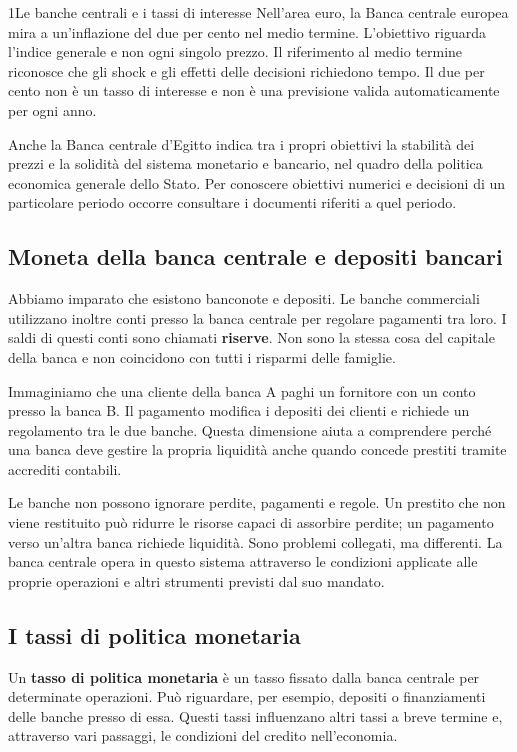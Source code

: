 \begin{lettura}{1}{Le banche centrali e i tassi di interesse}
Nell'area euro, la Banca centrale europea mira a un'inflazione del due per cento nel medio termine. L'obiettivo riguarda l'indice generale e non ogni singolo prezzo. Il riferimento al medio termine riconosce che gli shock e gli effetti delle decisioni richiedono tempo. Il due per cento non è un tasso di interesse e non è una previsione valida automaticamente per ogni anno.

Anche la Banca centrale d'Egitto indica tra i propri obiettivi la stabilità dei prezzi e la solidità del sistema monetario e bancario, nel quadro della politica economica generale dello Stato. Per conoscere obiettivi numerici e decisioni di un particolare periodo occorre consultare i documenti riferiti a quel periodo.

\subsection*{Moneta della banca centrale e depositi bancari}
Abbiamo imparato che esistono banconote e depositi. Le banche commerciali utilizzano inoltre conti presso la banca centrale per regolare pagamenti tra loro. I saldi di questi conti sono chiamati \textbf{riserve}. Non sono la stessa cosa del capitale della banca e non coincidono con tutti i risparmi delle famiglie.

Immaginiamo che una cliente della banca A paghi un fornitore con un conto presso la banca B. Il pagamento modifica i depositi dei clienti e richiede un regolamento tra le due banche. Questa dimensione aiuta a comprendere perché una banca deve gestire la propria liquidità anche quando concede prestiti tramite accrediti contabili.

Le banche non possono ignorare perdite, pagamenti e regole. Un prestito che non viene restituito può ridurre le risorse capaci di assorbire perdite; un pagamento verso un'altra banca richiede liquidità. Sono problemi collegati, ma differenti. La banca centrale opera in questo sistema attraverso le condizioni applicate alle proprie operazioni e altri strumenti previsti dal suo mandato.

\subsection*{I tassi di politica monetaria}
Un \textbf{tasso di politica monetaria} è un tasso fissato dalla banca centrale per determinate operazioni. Può riguardare, per esempio, depositi o finanziamenti delle banche presso di essa. Questi tassi influenzano altri tassi a breve termine e, attraverso vari passaggi, le condizioni del credito nell'economia.


\end{lettura}
